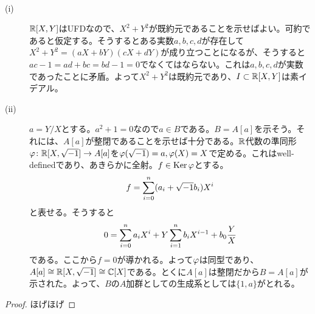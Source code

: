 
\begin{sol} ${}$
  \begin{description}
    \item[(i)] ${\mathbb R}[X,Y]$はUFDなので、$X^2 + Y^2$が既約元であることを示せばよい。可約であると仮定する。そうするとある実数$a,b,c,d $が存在して$X^2 + Y^2 = (aX + bY)(cX + dY)$が成り立つことになるが、そうすると$ac - 1 = ad + bc = bd - 1 = 0$でなくてはならない。これは$a,b,c,d$が実数であったことに矛盾。よって$X^2 + Y^2$は既約元であり、$I \subset {\mathbb R}[X,Y]$は素イデアル。
    \item[(ii)] $a = Y/X$とする。$a^2 + 1 = 0$なので$a \in B$である。$B = A[a]$を示そう。それには、$A[a]$が整閉であることを示せば十分である。${\mathbb R}$代数の準同形${\varphi} \colon {\mathbb R}[X,\sqrt{-1}] \to A[a]$を${\varphi}(\sqrt{-1})=a, {\varphi}(X)=X$で定める。これはwell-definedであり、あきらかに全射。$f \in \operatorname{Ker} {\varphi}$とする。
    \[
    f = \sum_{i=0}^n (a_i+\sqrt{-1} b_i) X^i
    \]
    と表せる。そうすると
    \[
    0 = \sum_{i=0}^n a_i X^i + Y \sum_{i=1}^n b_i X^{i-1}  + b_0 \frac{Y}{X}
    \]
    である。ここから$f=0$が導かれる。よって${\varphi}$は同型であり、$A[a] \cong {\mathbb R}[X,\sqrt{-1}] \cong {\mathbb C}[X]$である。とくに$A[a]$は整閉だから$B = A[a]$が示された。よって、$B$の$A$加群としての生成系としては$\{ 1, a \}$がとれる。
  \end{description}
\end{sol}


\newpage

\begin{proof}
  ほげほげ
\end{proof}

